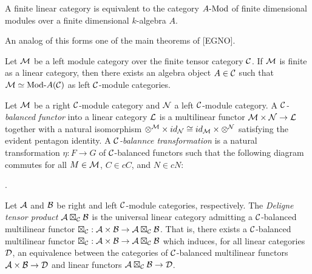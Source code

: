 \documentclass{amsart}
\begin{document}
\begin{remark}
	 A finite linear category is equivalent to the category $\Mod{A}{}$ of finite dimensional modules over a finite dimensional $k$-algebra $A$.
\end{remark}

An analog of this forms one of the main theorems of [EGNO]. 

\begin{theorem}[EGNO 2.11.6(i)] \label{thm:EGNO2.11.6}
	Let $\mathcal M$ be a left module category over the finite tensor category $\mathcal C$. If $\mathcal M$ is finite as a linear category, then there exists an algebra object $A \in \mathcal C$ such that $\cM \simeq \Mod{}{A} (\cC)$ as left $\mathcal C$-module categories. 
\end{theorem}

\begin{definition}
	Let $\mathcal M$ be a right $\mathcal C$-module category and $\mathcal N$ a left $\mathcal C$-module category. A {\em $\mathcal C$-balanced functor} into a linear category $\mathcal L$ is a multilinear functor $\mathcal M \times \mathcal N \to \mathcal L$ together with a natural isomorphism $\otimes^{\mathcal M} \times id_{\mathcal N} \cong id_{\mathcal M} \times \otimes^{\mathcal N}$ satisfying the evident pentagon identity. A {\em $\mathcal C$-balannce transformation} is a natural transformation $\eta:F \to G$ of $\mathcal C$-balanced functors such that the following diagram commutes for all $M \in \mathcal M$, $C \in cC$, and $N \in cN$:
\begin{center}
.
\end{center}
\end{definition}


\begin{definition}
	Let $\mathcal A$ and $\mathcal B$ be right and left $\mathcal C$-module categories, respectively. The {\em Deligne tensor product $\mathcal A \boxtimes_{\mathcal C} \mathcal B$} is the universal linear category admitting a $\mathcal C$-balanced multilinear functor $\boxtimes_{\mathcal C}: \mathcal A \times \mathcal B \to \mathcal A \boxtimes_{\mathcal C} \mathcal B$. That is, there exists a $\mathcal C$-balanced multilinear functor $\boxtimes_{\mathcal C}: \mathcal A \times \mathcal B \to \mathcal A \boxtimes_{\mathcal C} \mathcal B$ which induces, for all linear categories $\mathcal D$, an equivalence between the categories of $\mathcal C$-balanced multilinear functors $\mathcal A \times \mathcal B \to \mathcal D$ and linear functors $\mathcal A \boxtimes_{\mathcal C} \mathcal B \to \mathcal D$. 
\end{definition}
\end{document}
